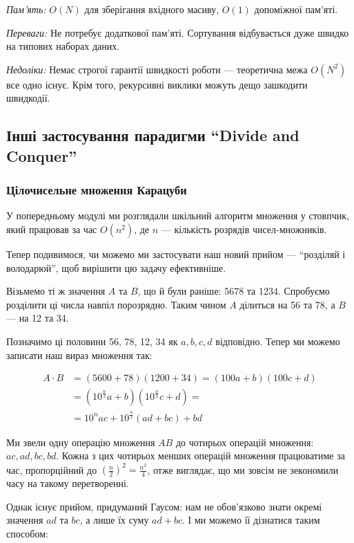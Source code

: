 \documentclass[12pt,a4paper]{report}
\begin{document}
\emph{Пам’ять:} \(O(N)\) для зберігання вхідного масиву, \(O(1)\) допоміжної пам’яті.

\emph{Переваги:} Не потребує додаткової пам’яті. Сортування відбувається дуже швидко на типових наборах даних.

\emph{Недоліки:} Немає строгої гарантії швидкості роботи --- теоретична межа \(O(N^2)\) все одно існує. Крім того, рекурсивні виклики можуть дещо зашкодити швидкодії.


\subsection{Інші застосування парадигми ``Divide and Conquer''}

\subsubsection*{Цілочисельне множення Карацуби}

У попередньому модулі ми розглядали шкільний алгоритм множення у стовпчик, який працював за час \(O(n^2)\), де \(n\) --- кількість розрядів чисел-множників.

Тепер подивимося, чи можемо ми застосувати наш новий прийом --- ``розділяй і володарюй'', щоб вирішити цю задачу ефективніше.

Візьмемо ті ж значення \(A\) та \(B\), що й були раніше: 5678 та 1234. Спробуємо розділити ці числа навпіл порозрядно. Таким чином \(A\) ділиться на 56 та 78, а \(B\) --- на 12 та 34.

Позначимо ці половини 56, 78, 12, 34 як \(a, b, c, d\) відповідно. Тепер ми можемо записати наш вираз множення так:

\begin{align*}
A \cdot B
& = (5600 + 78)(1200 + 34)
= (100a + b)(100c + d) \\
& = (10 ^ {\frac{n}{2}} a + b)(10 ^ {\frac{n}{2}} c + d) = \\
& = 10 ^ n a c + 10 ^ {\frac{n}{2}}(ad + bc) + bd
\end{align*}

Ми звели одну операцію множення \(AB\) до чотирьох операцій множення: \(ac, ad, bc, bd\). Кожна з цих чотирьох менших операцій множення працюватиме за час, пропорційний до \((\frac{n}{2})^2 = \frac{n^2}{4} \), отже виглядає, що ми зовсім не зекономили часу на такому перетворенні.

Однак існує прийом, придуманий Гаусом: нам не обов’язково знати окремі значення \(ad\) та \(bc\), а лише їх суму \(ad + bc\). І ми можемо її дізнатися таким способом:
\end{document}
